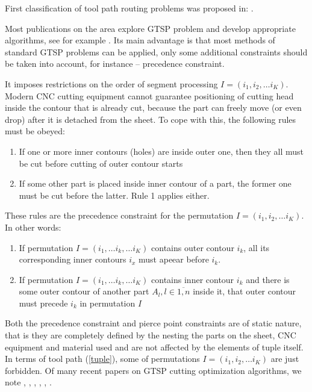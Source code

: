 \documentclass{ifacconf}
\begin{document}
First classification of tool path routing problems
was proposed in:
\cite{Hoeft1997Sep}.

Most publications on the area explore GTSP problem
and develop appropriate algorithms,
see for example \cite{Helsgaun2015Sep}.
Its main advantage is that most methods
of standard GTSP problems can be applied,
only some additional constraints should be
taken into account,
for instance -- precedence constraint.

It imposes restrictions on the order of
segment processing
$I = (i_1, i_2, \dots i_K)$.
Modern CNC cutting equipment cannot guarantee
positioning of cutting head inside the contour
that is already cut,
because the part can freely move
(or even drop)
after it is detached from the sheet.
To cope with this,
the following rules must be obeyed:

\begin{enumerate}
    \item{If one or more inner contours (holes) are inside outer one,
    then they all must be cut before cutting of outer contour starts
    }
    \item{If some other part is placed inside
    inner contour of a part,
    the former one must be cut before the latter.
    Rule 1 applies either.}
\end{enumerate}
These rules are the precedence constraint
for the permutation
$I = (i_1, i_2, \dots i_K)$.
In other words:
\begin{enumerate}
    \item{If permutation
    $I = (i_1, \dots i_k, \dots i_K)$
    contains outer contour $i_k$,
    all its corresponding inner contours $i_x$
    must apeear before $i_k$.
    }
    \item{If permutation
    $I = (i_1, \dots i_k, \dots i_K)$
    contains inner contour $i_k$
    and there is some outer contour
    of another part $A_l, l \in \overline{1,n}$
    inside it,
    that outer contour must precede $i_k$
    in permutation $I$}
\end{enumerate}

Both the precedence constraint
and pierce point constraints
are of static nature,
that is they are completely defined by
the nesting the parts on the sheet,
CNC equipment and material used
and are not affected by the elements
of tuple itself.
In terms of tool path
(\ref{tuple}),
some of permutations
$I = (i_1, i_2, \dots i_K)$
are just forbidden.
Of many recent papers
on GTSP cutting optimization algorithms,
we note
\cite{Vicencio2014Sep},
\cite{dewil2014construction},
\cite{yu2014route},
\cite{Karapetyan2012Jun},
\cite{Yang2010},
\cite{d2003tool}.
\end{document}

